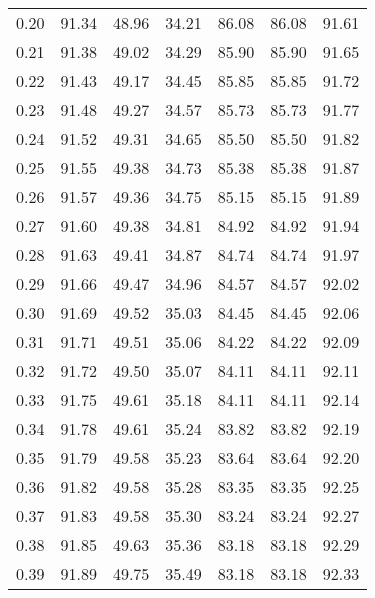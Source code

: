 \begin{tabular}{|c|c|c|c|c|c|c|}
      0.20 &     91.34 &     48.96 &      34.21 &   86.08 &      86.08 &         91.61 \\
      0.21 &     91.38 &     49.02 &      34.29 &   85.90 &      85.90 &         91.65 \\
      0.22 &     91.43 &     49.17 &      34.45 &   85.85 &      85.85 &         91.72 \\
      0.23 &     91.48 &     49.27 &      34.57 &   85.73 &      85.73 &         91.77 \\
      0.24 &     91.52 &     49.31 &      34.65 &   85.50 &      85.50 &         91.82 \\
      0.25 &     91.55 &     49.38 &      34.73 &   85.38 &      85.38 &         91.87 \\
      0.26 &     91.57 &     49.36 &      34.75 &   85.15 &      85.15 &         91.89 \\
      0.27 &     91.60 &     49.38 &      34.81 &   84.92 &      84.92 &         91.94 \\
      0.28 &     91.63 &     49.41 &      34.87 &   84.74 &      84.74 &         91.97 \\
      0.29 &     91.66 &     49.47 &      34.96 &   84.57 &      84.57 &         92.02 \\
      0.30 &     91.69 &     49.52 &      35.03 &   84.45 &      84.45 &         92.06 \\
      0.31 &     91.71 &     49.51 &      35.06 &   84.22 &      84.22 &         92.09 \\
      0.32 &     91.72 &     49.50 &      35.07 &   84.11 &      84.11 &         92.11 \\
      0.33 &     91.75 &     49.61 &      35.18 &   84.11 &      84.11 &         92.14 \\
      0.34 &     91.78 &     49.61 &      35.24 &   83.82 &      83.82 &         92.19 \\
      0.35 &     91.79 &     49.58 &      35.23 &   83.64 &      83.64 &         92.20 \\
      0.36 &     91.82 &     49.58 &      35.28 &   83.35 &      83.35 &         92.25 \\
      0.37 &     91.83 &     49.58 &      35.30 &   83.24 &      83.24 &         92.27 \\
      0.38 &     91.85 &     49.63 &      35.36 &   83.18 &      83.18 &         92.29 \\
      0.39 &     91.89 &     49.75 &      35.49 &   83.18 &      83.18 &         92.33 \\

\end{tabular}
